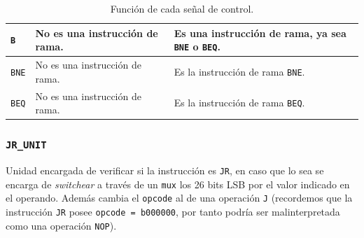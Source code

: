 \documentclass[a4paper]{article}
\begin{document}
\begin{table}[H]
\begin{tabular}{|p{1.6cm}|p{4.3cm}|p{4.3cm}|}
\texttt{B} &
  No es una instrucción de rama. & Es una instrucción de rama, ya sea \texttt{BNE} o \texttt{BEQ}. \\ \hline
\texttt{BNE} &
  No es una instrucción de rama. & Es la instrucción de rama \texttt{BNE}. \\ \hline
\texttt{BEQ} &
  No es una instrucción de rama. & Es la instrucción de rama \texttt{BEQ}. \\ \hline
\end{tabular}
\caption{Función de cada señal de control.}
\label{tab:ctl2-table}
\end{table}

\clearpage

%
%

\subsubsection{\texttt{JR\_UNIT}}
Unidad encargada de verificar si la instrucción es \texttt{JR}, en caso que lo sea se encarga de \textit{switchear} a través de un \texttt{mux} los 26 bits LSB por el valor indicado en el operando.
Además cambia el \texttt{opcode} al de una operación \texttt{J} (recordemos que la instrucción \texttt{JR} posee \texttt{opcode = b000000}, por tanto podría ser malinterpretada como una operación \texttt{NOP}). 
\end{document}
